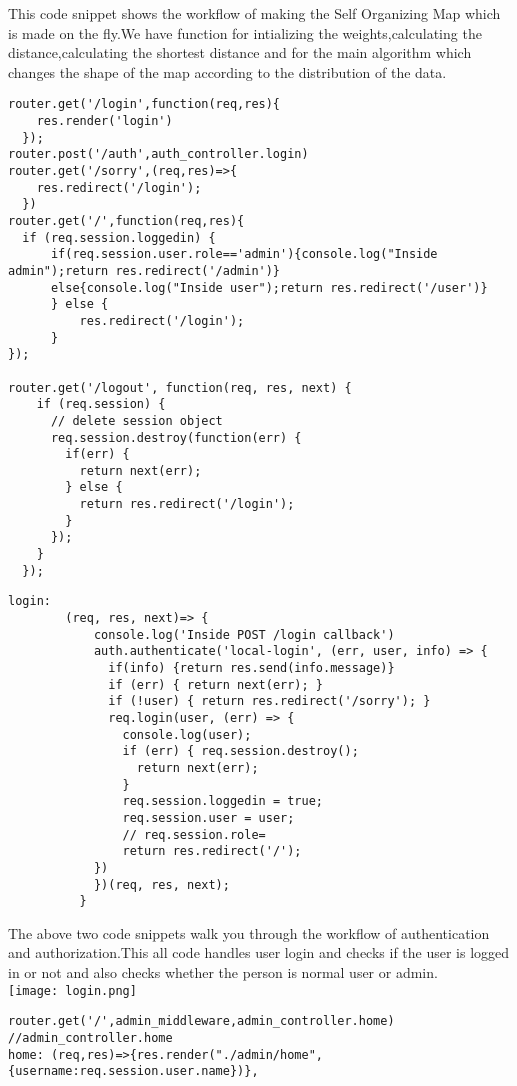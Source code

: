 \documentclass[a4paper,12pt,oneside]{book}
\begin{document}
This code snippet shows the workflow of making the Self Organizing Map which is made on the fly.We have function for intializing the weights,calculating the distance,calculating the shortest distance and for the main algorithm which changes the shape of the map according to the distribution of the data.\\
\begin{lstlisting}[caption = Login Routes]
router.get('/login',function(req,res){
    res.render('login')
  });
router.post('/auth',auth_controller.login)
router.get('/sorry',(req,res)=>{
    res.redirect('/login');
  })
router.get('/',function(req,res){
  if (req.session.loggedin) {
      if(req.session.user.role=='admin'){console.log("Inside admin");return res.redirect('/admin')}
      else{console.log("Inside user");return res.redirect('/user')}
      } else {
          res.redirect('/login');
      }
});

router.get('/logout', function(req, res, next) {
    if (req.session) {
      // delete session object
      req.session.destroy(function(err) {
        if(err) {
          return next(err);
        } else {
          return res.redirect('/login');
        }
      });
    }
  });
\end{lstlisting}
\begin{lstlisting}[caption = Auth_Controller]
login:
        (req, res, next)=> {
            console.log('Inside POST /login callback')
            auth.authenticate('local-login', (err, user, info) => {
              if(info) {return res.send(info.message)}
              if (err) { return next(err); }
              if (!user) { return res.redirect('/sorry'); }
              req.login(user, (err) => {
                console.log(user);
                if (err) { req.session.destroy();
                  return next(err); 
                }
                req.session.loggedin = true;
                req.session.user = user;
                // req.session.role=
                return res.redirect('/');
            })
            })(req, res, next);
          }
\end{lstlisting}
The above two code snippets walk you through the workflow of authentication and authorization.This all code handles user login and checks if the user is logged in or not and also checks whether the person is normal user or admin.\\
\texttt{[image: login.png]}
\\
\begin{lstlisting}[caption=Admin Home]
router.get('/',admin_middleware,admin_controller.home)
//admin_controller.home
home: (req,res)=>{res.render("./admin/home",{username:req.session.user.name})},
\end{lstlisting}\\
\end{document}
